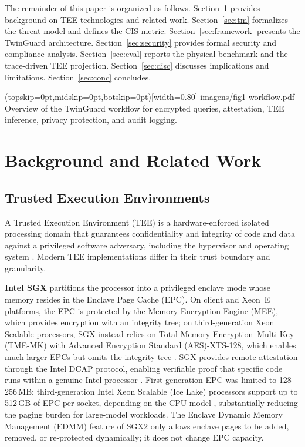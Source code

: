 \documentclass{ieeeaccess}
\begin{document}
The remainder of this paper is organized as follows. Section~\ref{sec:bg}
provides background on TEE technologies and related work. Section~\ref{sec:tm}
formalizes the threat model and defines the CIS metric.
Section~\ref{sec:framework} presents the TwinGuard architecture.
Section~\ref{sec:security} provides formal security and compliance analysis.
Section~\ref{sec:eval} reports the physical benchmark and the trace-driven
TEE projection. Section~\ref{sec:disc}
discusses implications and limitations. Section~\ref{sec:conc} concludes.

\Figure[t!](topskip=0pt,midskip=0pt,botskip=0pt)[width=0.80\textwidth]
{imagens/fig1-workflow.pdf}
{Overview of the TwinGuard workflow for encrypted queries, attestation,
TEE inference, privacy protection, and audit logging.\label{fig:graphical-abstract}}

\section{Background and Related Work}
\label{sec:bg}

\subsection{Trusted Execution Environments}

A Trusted Execution Environment (TEE) is a hardware-enforced isolated
processing domain that guarantees confidentiality and integrity of code and
data against a privileged software adversary, including the hypervisor and
operating system \cite{sabt2015trusted}. Modern TEE implementations differ
in their trust boundary and granularity.

\textbf{Intel SGX} partitions the processor into a privileged enclave mode
whose memory resides in the Enclave Page Cache (EPC). On client and Xeon~E
platforms, the EPC is protected by the Memory Encryption Engine (MEE), which
provides encryption with an integrity tree; on third-generation Xeon Scalable
processors, SGX instead relies on Total Memory Encryption--Multi-Key (TME-MK) with Advanced Encryption Standard (AES)-XTS-128, which enables much larger EPCs but omits the integrity tree
\cite{elhindi2022sgx}. SGX provides remote attestation
through the Intel DCAP protocol, enabling
verifiable proof that specific code runs within a genuine Intel processor
\cite{anati2013innovative, johnson2016intel}. First-generation EPC was
limited to 128--256\,MB; third-generation Intel Xeon Scalable (Ice Lake)
processors support up to 512\,GB of EPC per socket, depending on the CPU
model \cite{elhindi2022sgx, lenovo2023sgx}, substantially reducing the paging burden for
large-model workloads. The Enclave Dynamic Memory Management (EDMM) feature of SGX2 only allows enclave pages to be
added, removed, or re-protected dynamically; it does not change EPC capacity.
\end{document}

